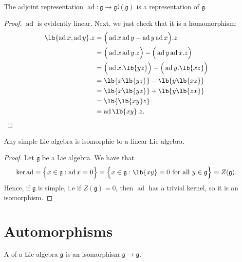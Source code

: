 \documentclass{article}
\DeclarePairedDelimiter\lb\lbrack\rbrack
\DeclareMathOperator{\ad}{ad}
\newcommand*\frkg{{\ensuremath{\mathfrak{g}}}}
\newcommand*\gl{\ensuremath{\mathfrak{gl}}}
\newcommand*\acts{.}
\begin{document}
\begin{theorem}
    The adjoint representation $\ad: \frkg \to \gl(\frkg)$ is a representation of $\frkg$.
\end{theorem}

\begin{proof}
    $\ad$ is evidently linear.
    Next, we just check that it is a homomorphism:
    \begin{align*}
        \lb{\ad x, \ad y} \acts z
        &=
        \Big(\ad x \ad y - \ad y \ad x\Big) \acts z 
        \\
        &=
        \Big(\ad x \ad y \acts z\Big) - \Big(\ad y \ad x \acts z\Big) 
        \\
        &=
        \Big(
            \ad x \acts \lb{yz}
        \Big)
        - 
        \Big(
            \ad y \acts \lb{xz}
        \Big)
        \\
        &=
        \lb{x\lb{yz}} - \lb{y\lb{xz}}
        \\
        &=
        \lb{x\lb{yz}} + \lb{y\lb{zx}}
        \\
        &=
        \lb{\lb{xy}z}
        \\
        &=
        \ad \lb{xy} \acts z.
    \end{align*}
\end{proof}

\begin{corollary}
    Any simple Lie algebra is isomorphic to a linear Lie algebra.
\end{corollary}

\begin{proof}
    Let $\frkg$ be a Lie algebra.
    We have that
    \[
        \ker \ad 
        =
        \Big\{
            x \in \frkg: \ad x = 0
        \Big\}
        =
        \Big\{
            x \in \frkg: \lb{xy} = 0 \text{ for all } y \in \frkg
        \Big\}
        =
        Z(\frkg).
    \]
    Hence, if $\frkg$ is simple, i.e if $Z(\frkg) = 0$, then $\ad$ has a trivial kernel, so it is an isomorphism. 
\end{proof}

\section{Automorphisms}

\begin{definition}
    A  of a Lie algebra $\frkg$ is an isomorphism $\frkg \to \frkg$.
\end{definition}
\end{document}
